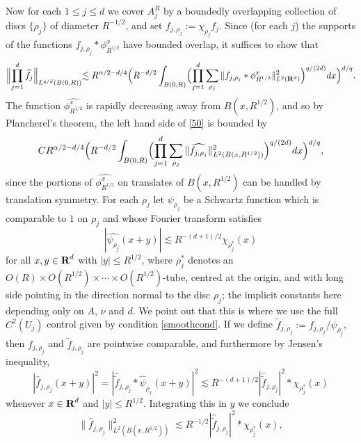 Now for each $1\leq j\leq d$ we cover $A_{j}^{R}$ by a boundedly overlapping
collection of discs $\{\rho_{j}\}$ of diameter $R^{-1/2}$, and
set $f_{j,\rho_j}:=\chi_{\rho_{j}}f_{j}$. Since (for each $j$) the supports
of the functions $f_{j,\rho_j}*\phi_{R^{1/2}}^{x}$ have bounded overlap, it
suffices to show that
\begin{equation}\label{50}
\Bigl\|\prod_{j=1}^{d}\widehat{f}_{j}\Bigl\|_{L^{q/d}(B(0,R))}
\lesssim R^{\alpha/2-d/4}\Bigl(
R^{-d/2}\int_{B(0,R)}\Bigl(\prod_{j=1}^{d}
\sum_{\rho_{j}}\|f_{j,\rho_j}*\phi_{R^{1/2}}^{x}\|_{L^2({\bf R}^d)}^{2}
\Bigr)^{q/(2d)}
dx\Bigr)^{d/q}.
\end{equation}
The function $\widehat{\phi_{R^{1/2}}^{x}}$ is rapidly decreasing away from
$B(x,R^{1/2})$, and so by Plancherel's theorem, the left hand side
of \eqref{50} is bounded by
$$
C R^{\alpha/2-d/4}\Bigl(
R^{-d/2}\int_{B(0,R)}\Bigl(\prod_{j=1}^{d}
\sum_{\rho_{j}}\|\widehat{f_{j,\rho_j}}\|_{L^{2}(B(x,R^{1/2}))}^{2}
\Bigr)^{q/(2d)}dx\Bigr)^{d/q},
$$
since the portions of $\widehat{\phi_{R^{1/2}}^{x}}$ on translates of
$B(x,R^{1/2})$ can be handled by translation symmetry.
For each $\rho_j$ let $\psi_{\rho_j}$ be a Schwartz
function which is comparable
to $1$ on $\rho_j$ and whose Fourier transform satisfies
$$
|\widehat{\psi_{\rho_j}}(x+y)|\lesssim R^{-(d+1)/2}\chi_{\rho_{j}^*}(x)
$$
for all $x,y \in {\hbox{\bf R}}^d$ with $|y| \leq R^{1/2}$, where $\rho_{j}^*$ denotes an $O(R)\times
O(R^{1/2})\times \cdots\times O(R^{1/2})$-tube, centred at the
origin, and with long side pointing in the direction normal to the
disc $\rho_{j}$; the implicit constants here depending only on
$A$, $\nu$ and $d$. We point out that this is where we use the
full $C^{2}(U_j)$ control given by condition \eqref{smoothcond}.
If we define
$\tilde{f}_{j,\rho_j}:=f_{j,\rho_j}/\psi_{\rho_j}$, then $f_{j,\rho_j}$
and $\tilde{f}_{j,\rho_j}$ are pointwise comparable, and furthermore
by Jensen's inequality,
$$|\widehat{f}_{j,\rho_j}(x+y)|^{2}=|\widehat{\tilde{f}}_{j,\rho_{j}}*
\widehat{\psi}_{\rho_j}(x+y)|^{2}\lesssim
R^{-(d+1)/2}|\widehat{\tilde{f}}_{j,\rho_{j}}|^{2}*\chi_{\rho_{j}^*}(x)
$$
whenever $x \in {\hbox{\bf R}}^d$ and $|y| \leq R^{1/2}$.  Integrating this in $y$ we conclude
$$
\|\widehat{f}_{j,\rho_j}\|_{L^{2}(B(x,R^{1/2}))}^{2}\lesssim
R^{-1/2}|\widehat{\tilde{f}}_{j,\rho_{j}}|^{2}*\chi_{\rho_{j}^*}(x),
$$
